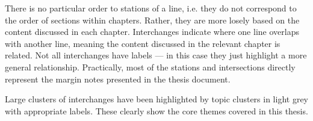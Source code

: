 \begin{figure}[!htbp]
\end{figure}

There is no particular order to stations of a line, i.e. they do not correspond to the order of sections within chapters. Rather, they are more losely based on the content discussed in each chapter. Interchanges indicate where one line overlaps with another line, meaning the content discussed in the relevant chapter is related. Not all interchanges have labels --- in this case they just highlight a more general relationship. Practically, most of the stations and intersections directly represent the margin notes presented in the thesis document.

Large clusters of interchanges have been highlighted by topic clusters in light grey with appropriate labels. These clearly show the core themes covered in this thesis.

